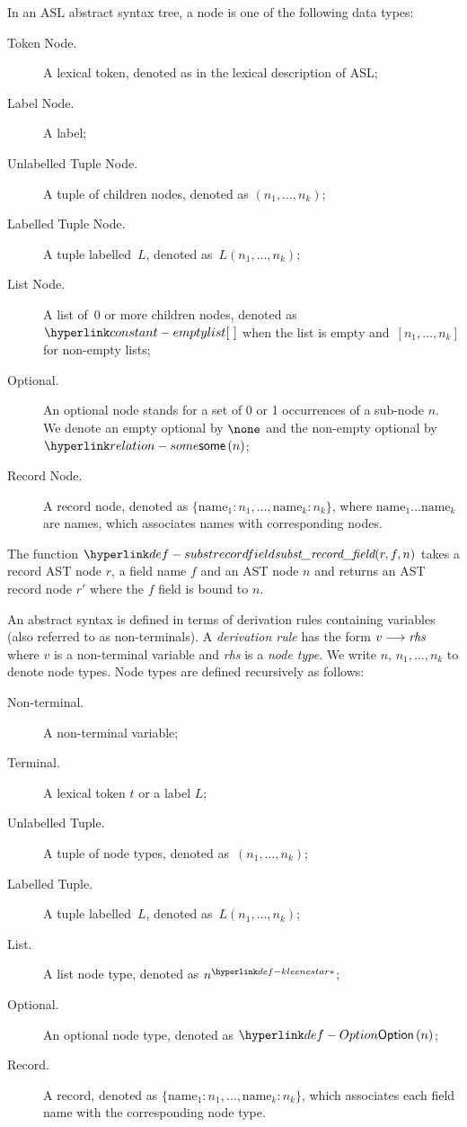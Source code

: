In an ASL abstract syntax tree, a node is one of the following data types:
\begin{description}
\item[Token Node.] A lexical token, denoted as in the lexical description of ASL;
\item[Label Node.] A label;
\item[Unlabelled Tuple Node.] A tuple of children nodes, denoted as $(n_1,\ldots,n_k)$;
\item[Labelled Tuple Node.] A tuple labelled~$L$, denoted as~$L(n_1,\ldots,n_k)$;
\item[List Node.] A list of~$0$ or more children nodes, denoted as~$\emptylist$
      when the list is empty and~$[n_1,\ldots,n_k]$ for non-empty lists;
\item[Optional.] An optional node stands for a set of 0 or 1 occurrences of a sub-node $n$.
      We denote an empty optional by $\none$ and the non-empty optional by $\some{n}$;
\item[Record Node.] A record node, denoted as $\{\text{name}_1 : n_1,\ldots,\text{name}_k : n_k\}$, where
      $\text{name}_1 \ldots \text{name}_k$ are names, which associates names with corresponding nodes.
\end{description}

\hypertarget{def-substrecordfield}{}
The function $\substrecordfield(r, f, n)$ takes a record AST node $r$, a field name $f$ and an AST node $n$
and returns an AST record node $r'$ where the $f$ field is bound to $n$.


An abstract syntax is defined in terms of derivation rules containing variables (also referred to as non-terminals).
%
A \emph{derivation rule} has the form $v \longrightarrow \textit{rhs}$ where $v$ is a non-terminal variable and \textit{rhs} is a \emph{node type}. We write $n$, $n_1,\ldots,n_k$ to denote node types.
%
Node types are defined recursively as follows:
\begin{description}
\item[Non-terminal.] A non-terminal variable;
\item[Terminal.] A lexical token $t$ or a label $L$;
\item[Unlabelled Tuple.] A tuple of node types, denoted as~$(n_1,\ldots,n_k)$;
\item[Labelled Tuple.] A tuple labelled~$L$, denoted as~$L(n_1,\ldots,n_k)$;
\item[List.] A list node type, denoted as $\KleeneStar{n}$;
\item[Optional.] An optional node type, denoted as $\Option{n}$;
\item[Record.] A record, denoted as $\{\text{name}_1 : n_1,\ldots,\text{name}_k : n_k\}$,
     which associates each field name with the corresponding node type.
\end{description}

